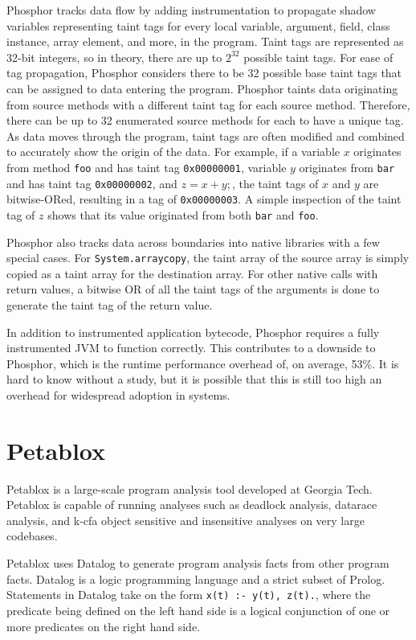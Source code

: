 Phosphor tracks data flow by adding instrumentation to propagate shadow variables representing taint tags for every local variable, argument, field, class instance, array element, and more, in the program. Taint tags are represented as 32-bit integers, so in theory, there are up to $2^{32}$ possible taint tags. For ease of tag propagation, Phosphor considers there to be 32 possible base taint tags that can be assigned to data entering the program. Phosphor taints data originating from source methods with a different taint tag for each source method. Therefore, there can be up to 32 enumerated source methods for each to have a unique tag. As data moves through the program, taint tags are often modified and combined to accurately show the origin of the data. For example, if a variable $x$ originates from method \texttt{foo} and has taint tag \texttt{0x00000001}, variable $y$ originates from \texttt{bar} and has taint tag \texttt{0x00000002}, and $z = x + y;$, the taint tags of $x$ and $y$ are bitwise-ORed, resulting in a tag of \texttt{0x00000003}. A simple inspection of the taint tag of $z$ shows that its value originated from both \texttt{bar} and \texttt{foo}.

Phosphor also tracks data across boundaries into native libraries with a few special cases. For \texttt{System.arraycopy}, the taint array of the source array is simply copied as a taint array for the destination array. For other native calls with return values, a bitwise OR of all the taint tags of the arguments is done to generate the taint tag of the return value.

In addition to instrumented application bytecode, Phosphor requires a fully instrumented JVM to function correctly. This contributes to a downside to Phosphor, which is the runtime performance overhead of, on average, 53\%. It is hard to know without a study, but it is possible that this is still too high an overhead for widespread adoption in systems.
\section{Petablox}
Petablox \cite{petablox} is a large-scale program analysis tool developed at Georgia Tech. Petablox is capable of running analyses such as deadlock analysis, datarace analysis, and k-cfa object sensitive and insensitive analyses on very large codebases.

Petablox uses Datalog \cite{datalog} to generate program analysis facts from other program facts. Datalog is a logic programming language and a strict subset of Prolog. Statements in Datalog take on the form \texttt{x(t) :- y(t), z(t).}, where the predicate being defined on the left hand side is a logical conjunction of one or more predicates on the right hand side.

